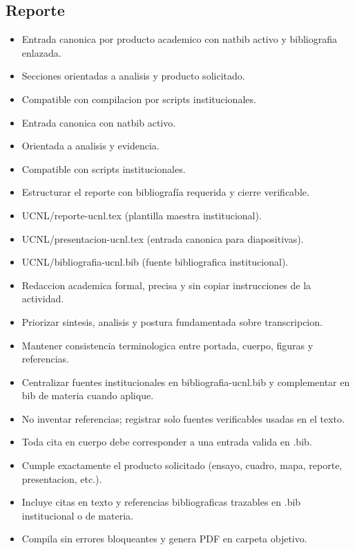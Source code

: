 \documentclass[12pt]{article}
\begin{document}
\subsection*{Reporte}
\begin{itemize}[leftmargin=*]
  \item Entrada canonica por producto academico con natbib activo y bibliografia enlazada.
  \item Secciones orientadas a analisis y producto solicitado.
  \item Compatible con compilacion por scripts institucionales.
  \item Entrada canonica con natbib activo.
  \item Orientada a analisis y evidencia.
  \item Compatible con scripts institucionales.
  \item Estructurar el reporte con bibliografía requerida y cierre verificable.
  \item UCNL/reporte-ucnl.tex (plantilla maestra institucional).
  \item UCNL/presentacion-ucnl.tex (entrada canonica para diapositivas).
  \item UCNL/bibliografia-ucnl.bib (fuente bibliografica institucional).
  \item Redaccion academica formal, precisa y sin copiar instrucciones de la actividad.
  \item Priorizar sintesis, analisis y postura fundamentada sobre transcripcion.
  \item Mantener consistencia terminologica entre portada, cuerpo, figuras y referencias.
  \item Centralizar fuentes institucionales en bibliografia-ucnl.bib y complementar en bib de materia cuando aplique.
  \item No inventar referencias; registrar solo fuentes verificables usadas en el texto.
  \item Toda cita en cuerpo debe corresponder a una entrada valida en .bib.
  \item Cumple exactamente el producto solicitado (ensayo, cuadro, mapa, reporte, presentacion, etc.).
  \item Incluye citas en texto y referencias bibliograficas trazables en .bib institucional o de materia.
  \item Compila sin errores bloqueantes y genera PDF en carpeta objetivo.
\end{itemize}
\end{document}
